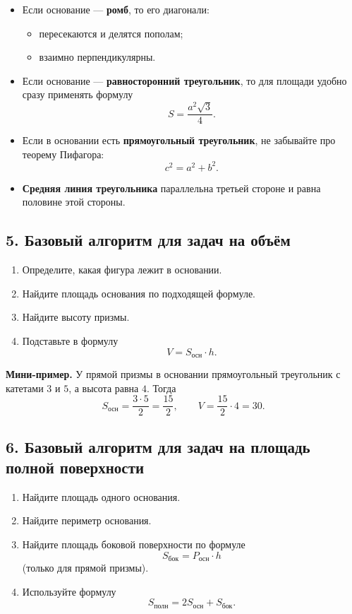 \documentclass[a4paper,12pt]{article}
\newcommand{\Area}{S}
\newcommand{\Vol}{V}
\newcommand{\per}{P}
\begin{document}
\begin{itemize}
    \item Если основание --- \textbf{ромб}, то его диагонали:
    \begin{itemize}
        \item пересекаются и делятся пополам;
        \item взаимно перпендикулярны.
    \end{itemize}
    
    \item Если основание --- \textbf{равносторонний треугольник}, то для площади удобно сразу применять формулу
    \[
    \Area=\frac{a^{2}\sqrt{3}}{4}.
    \]
    
    \item Если в основании есть \textbf{прямоугольный треугольник}, не забывайте про теорему Пифагора:
    \[
    c^2=a^2+b^2.
    \]
    
    \item \textbf{Средняя линия треугольника} параллельна третьей стороне и равна половине этой стороны.
\end{itemize}

\subsection*{5. Базовый алгоритм для задач на объём}

\begin{enumerate}
    \item Определите, какая фигура лежит в основании.
    \item Найдите площадь основания по подходящей формуле.
    \item Найдите высоту призмы.
    \item Подставьте в формулу
    \[
    \Vol=\Area_{\text{осн}}\cdot h.
    \]
\end{enumerate}

\textbf{Мини-пример.} У прямой призмы в основании прямоугольный треугольник с катетами $3$ и $5$, а высота равна $4$. Тогда
\[
\Area_{\text{осн}}=\frac{3\cdot 5}{2}=\frac{15}{2},
\qquad
\Vol=\frac{15}{2}\cdot 4=30.
\]

\subsection*{6. Базовый алгоритм для задач на площадь полной поверхности}

\begin{enumerate}
    \item Найдите площадь одного основания.
    \item Найдите периметр основания.
    \item Найдите площадь боковой поверхности по формуле
    \[
    \Area_{\text{бок}}=\per_{\text{осн}}\cdot h
    \]
    (только для прямой призмы).
    \item Используйте формулу
    \[
    \Area_{\text{полн}}=2\Area_{\text{осн}}+\Area_{\text{бок}}.
    \]
\end{enumerate}
\end{document}
